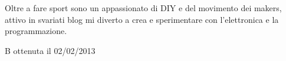 \documentclass[italian,a4paper]{europasscv}
\begin{document}
\begin{europasscv}
	 {
		Oltre a fare sport sono un appassionato di DIY e del movimento dei
		makers, attivo in svariati blog mi diverto a crea e sperimentare con
		l'elettronica e la programmazione.
	}

	 {
		B ottenuta il 02/02/2013
	}
	\end{europasscv}
\end{document}
